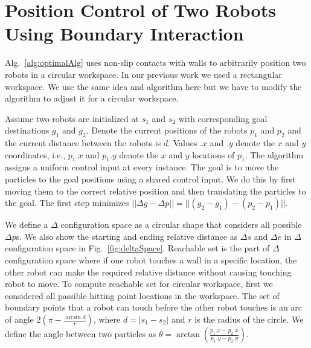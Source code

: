 

\section{Position Control of Two Robots Using Boundary Interaction}\label{sec:PostionControl2Robots}


Alg.~\ref{alg:optimalAlg} uses non-slip contacts with walls to arbitrarily position two robots in a circular workspace. In our previous work we used a rectangular workspace. We use the same idea and algorithm here but we have to modify the algorithm to adjust it for a circular workspace.

Assume two robots are initialized at $s_1$ and $s_2$ with corresponding goal destinations $g_1$ and $g_2$. 
Denote the current positions of the robots  $p_1$ and $p_2$ and the current distance between the robots is $d$.
Values $.x$ and $.y$ denote the $x$ and $y$ coordinates, i.e., $p_1.x$ and $p_1.y$ denote the $x$ and $y$ locations of $p_1$. 
The algorithm assigns a uniform control input at every instance.
The goal is to move the particles to the goal positions using a shared control input. We do this by first moving them to the correct relative position and then translating the particles to the goal. The first step minimizes  
 $||\Delta g - \Delta p || = ||(g_2-g_1)- (p_2-p_1)||$. 
 
 We define a $\Delta$ configuration space as a circular shape that considers all possible $\Delta p$s. We also show the starting and ending relative distance as $\Delta s$ and $\Delta e$ in $\Delta$ configuration space in Fig.~\ref{fig:deltaSpace}. Reachable set is the part of $\Delta$ configuration space where if one robot touches a wall in a specific location, the other robot can make the required relative distance without causing touching robot to move. To compute reachable set for circular workspace, first we considered all passible hitting point locations in the workspace. 
 The set of boundary points that a robot can touch before the  other robot  touches is an arc of angle $2(\pi - \frac{\arcsin{d}}{r})$, where $d= |s_1 - s_2|$ and $r$ is the radius of the circle.
 We define the angle between two particles as $\theta = \arctan(\frac{p_1.x-p_2.x}{p_1.y - p_2.y})$. 
 
